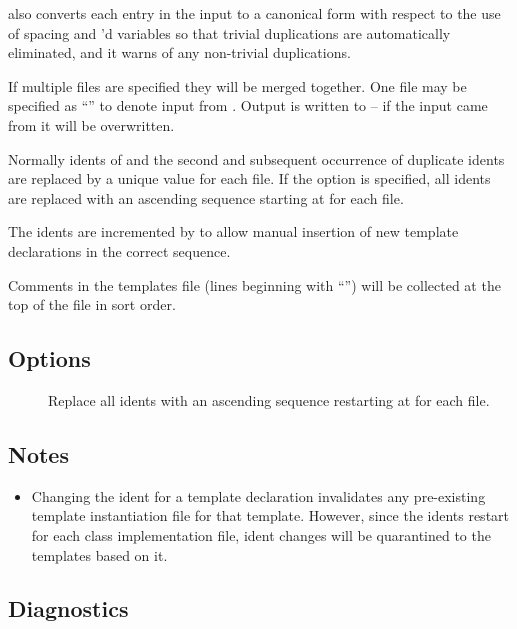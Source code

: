  also converts each entry in the input to a canonical form with
respect to the use of spacing and 'd variables so that trivial
duplications are automatically eliminated, and it warns of any non-trivial
duplications.

If multiple files are specified they will be merged together.  One file may
be specified as ``\file{-}'' to denote input from .  Output is
written to  -- if the input came from  it will
be overwritten.

Normally idents of  and the second and subsequent occurrence of
duplicate idents are replaced by a unique value for each  file.  If
the  option is specified, all idents are replaced with an ascending
sequence starting at  for each  file.

The idents are incremented by  to allow manual insertion of new
template declarations in the correct sequence.

Comments in the templates file (lines beginning with ``\code{\#}'') will be
collected at the top of the file in sort order.

\subsection*{Options}
 
\begin{description}
\item[]
   Replace all idents with an ascending sequence restarting at  for
   each  file.
\end{description}
 
\subsection*{Notes}
 
\begin{itemize}
\item
    Changing the ident for a template declaration invalidates any pre-existing
    template instantiation  file for that template.  However, since
    the idents restart for each class implementation  file, ident
    changes will be quarantined to the templates based on it.
\end{itemize}
 
\subsection*{Diagnostics}
 

